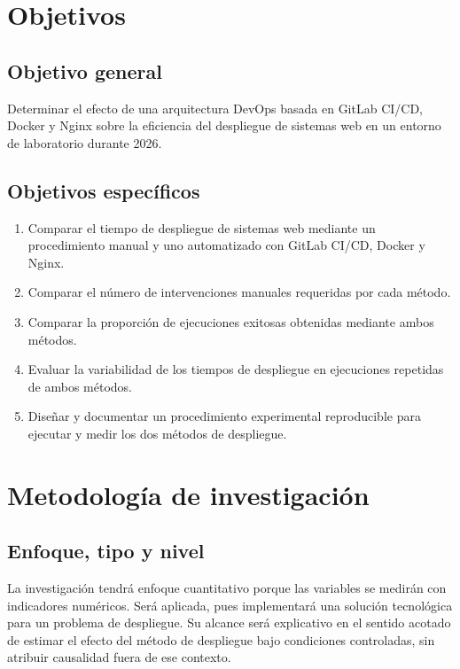 \documentclass[12pt,a4paper]{article}
\begin{document}
\section{Objetivos}

\subsection{Objetivo general}

Determinar el efecto de una arquitectura DevOps basada en GitLab CI/CD, Docker y Nginx sobre la eficiencia del despliegue de sistemas web en un entorno de laboratorio durante 2026.

\subsection{Objetivos específicos}

\begin{enumerate}
  \item Comparar el tiempo de despliegue de sistemas web mediante un procedimiento manual y uno automatizado con GitLab CI/CD, Docker y Nginx.
  \item Comparar el número de intervenciones manuales requeridas por cada método.
  \item Comparar la proporción de ejecuciones exitosas obtenidas mediante ambos métodos.
  \item Evaluar la variabilidad de los tiempos de despliegue en ejecuciones repetidas de ambos métodos.
  \item Diseñar y documentar un procedimiento experimental reproducible para ejecutar y medir los dos métodos de despliegue.
\end{enumerate}

\section{Metodología de investigación}

\subsection{Enfoque, tipo y nivel}

La investigación tendrá enfoque cuantitativo porque las variables se medirán con indicadores numéricos. Será aplicada, pues implementará una solución tecnológica para un problema de despliegue. Su alcance será explicativo en el sentido acotado de estimar el efecto del método de despliegue bajo condiciones controladas, sin atribuir causalidad fuera de ese contexto.
\end{document}
